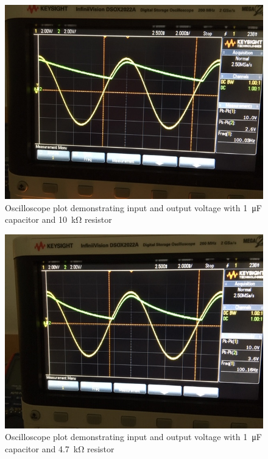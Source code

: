 \documentclass{article}
\begin{document}
\begin{figure}[H]
  \centering
  \includegraphics[width=\textwidth]{image/Part2/1u10k.JPG}
  \caption{Oscilloscope plot demonstrating input and output voltage with \SI{1}{\micro\farad} capacitor and \SI{10}{\kilo\ohm} resistor}
\end{figure}
\begin{figure}[H]
  \centering
  \includegraphics[width=\textwidth]{image/Part2/1u4k7.JPG}
  \caption{Oscilloscope plot demonstrating input and output voltage with \SI{1}{\micro\farad} capacitor and \SI{4.7}{\kilo\ohm} resistor}
\end{figure}
\end{document}
